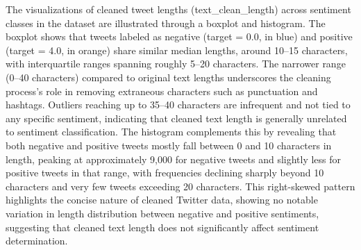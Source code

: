 The visualizations of cleaned tweet lengths (text\_clean\_length) across sentiment classes in the dataset are illustrated through a boxplot and histogram. The boxplot shows that tweets labeled as negative (target = 0.0, in blue) and positive (target = 4.0, in orange) share similar median lengths, around 10–15 characters, with interquartile ranges spanning roughly 5–20 characters. The narrower range (0–40 characters) compared to original text lengths underscores the cleaning process’s role in removing extraneous characters such as punctuation and hashtags. Outliers reaching up to 35–40 characters are infrequent and not tied to any specific sentiment, indicating that cleaned text length is generally unrelated to sentiment classification. The histogram complements this by revealing that both negative and positive tweets mostly fall between 0 and 10 characters in length, peaking at approximately 9,000 for negative tweets and slightly less for positive tweets in that range, with frequencies declining sharply beyond 10 characters and very few tweets exceeding 20 characters. This right-skewed pattern highlights the concise nature of cleaned Twitter data, showing no notable variation in length distribution between negative and positive sentiments, suggesting that cleaned text length does not significantly affect sentiment determination.

